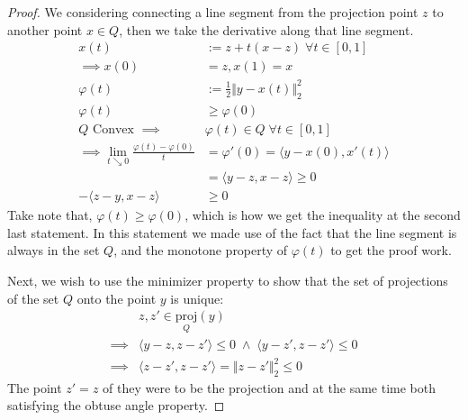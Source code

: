 \documentclass[]{article}
\theoremstyle{definition}
\begin{document}
    \begin{proof}
        We considering connecting a line segment from the projection point $z$ to another point $x\in Q$, then we take the derivative along that line segment. 
        \begin{align}
            x(t)& := z + t(x - z)\;\forall t \in [0, 1]
            \\
            \implies  x(0) &= z,  x(1) = x
            \\
            \varphi(t) &:= \frac{1}{2}\Vert y - x(t)\Vert_2^2
            \\
            \varphi(t) &\ge \varphi(0)
            \\
            Q \text{ Convex }\implies & 
            \varphi(t) \in Q\; \forall t \in [0, 1]
            \\
            \implies \lim_{t \searrow 0}
            \frac{\varphi(t) - \varphi(0)}{t}
            &= \varphi'(0) = 
            \langle  y - x(0), x'(t)\rangle
            \\
            &= \langle y - z, x - z\rangle \ge 0
            \\
            - 
            \langle z - y, x - z \rangle &\ge 0
        \end{align}
        Take note that, $\varphi(t) \ge \varphi(0)$, which is how we get the inequality at the second last statement. In this statement we made use of the fact that the line segment is always in the set $Q$, and the monotone property of $\varphi(t)$ to get the proof work. 
        \par
        Next, we wish to use the minimizer property to show that the set of projections of the set $Q$ onto the point $y$ is unique: 
        \begin{align}
            & z, z' \in \underset{Q}{\text{proj}}(y)
            \\
            \implies
            &
            \langle y - z, z - z'\rangle \le 0 \;\wedge\;
            \langle y - z', z - z'\rangle \le 0
            \\
            \implies &
            \langle z - z', z - z'\rangle = \Vert z - z'\Vert_2^2 \le 0
        \end{align}
        The point $z' = z$ of they were to be the projection and at the same time both satisfying the obtuse angle property. 
    \end{proof}
\end{document}
